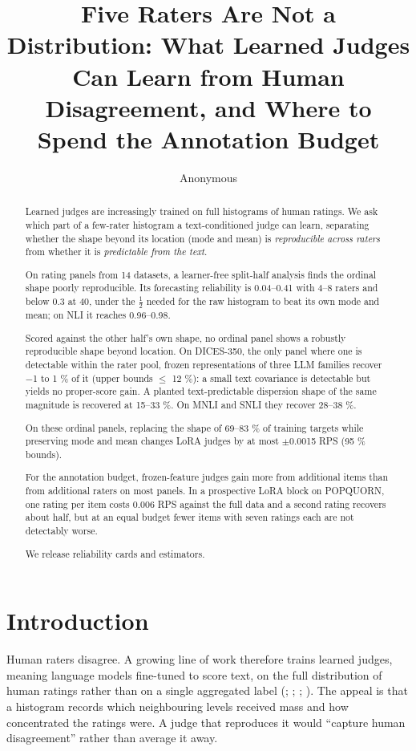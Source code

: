 \documentclass[10pt,twocolumn]{article}
\title{Five Raters Are Not a Distribution: What Learned Judges Can Learn from Human Disagreement, and Where to Spend the Annotation Budget}
\author{Anonymous}
\begin{document}
\maketitle
\begin{abstract}
Learned judges are increasingly trained on full histograms of human ratings. We ask which part of a few-rater histogram a text-conditioned judge can learn, separating whether the shape beyond its location (mode and mean) is \emph{reproducible across raters} from whether it is \emph{predictable from the text}.

On rating panels from 14 datasets, a learner-free split-half analysis finds the ordinal shape poorly reproducible. Its forecasting reliability is 0.04--0.41 with 4--8 raters and below 0.3 at 40, under the $\tfrac12$ needed for the raw histogram to beat its own mode and mean; on NLI it reaches 0.96--0.98.

Scored against the other half's own shape, no ordinal panel shows a robustly reproducible shape beyond location. On DICES-350, the only panel where one is detectable within the rater pool, frozen representations of three LLM families recover $-$1 to 1 \% of it (upper bounds $\leq$ 12 \%): a small text covariance is detectable but yields no proper-score gain. A planted text-predictable dispersion shape of the same magnitude is recovered at 15--33 \%. On MNLI and SNLI they recover 28--38 \%.

On these ordinal panels, replacing the shape of 69--83 \% of training targets while preserving mode and mean changes LoRA judges by at most $\pm$0.0015 RPS (95 \% bounds).

For the annotation budget, frozen-feature judges gain more from additional items than from additional raters on most panels. In a prospective LoRA block on POPQUORN, one rating per item costs 0.006 RPS against the full data and a second rating recovers about half, but at an equal budget fewer items with seven ratings each are not detectably worse.

We release reliability cards and estimators.
\end{abstract}

\section{Introduction}

Human raters disagree. A growing line of work therefore trains learned judges, meaning language models fine-tuned to score text, on the full distribution of human ratings rather than on a single aggregated label (\citealp{chen2025beyond}; \citealp{singh2025distributions}; \citealp{kohli2026metric}; \citealp{benitosantos2025beyond}). The appeal is that a histogram records which neighbouring levels received mass and how concentrated the ratings were. A judge that reproduces it would ``capture human disagreement'' rather than average it away.
\end{document}
